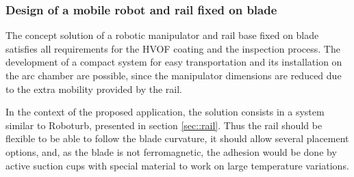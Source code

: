 \subsubsection{Design of a mobile robot and rail fixed on blade}\label{proj_rail}
The concept solution of a robotic manipulator and rail base fixed on blade
satisfies all requirements for the HVOF coating and the inspection process. The
development of a compact system for easy transportation and its installation on the arc
chamber are possible, since the manipulator dimensions are reduced due to the
extra mobility provided by the rail.


In the context of the proposed application, the solution consists in a system
similar to Roboturb, presented in section \ref{sec::rail}. Thus the rail should
be flexible to be able to follow the blade curvature, it should allow several
placement options, and, as the blade is not ferromagnetic, the adhesion would
be done by active suction cups with special material to work on large
temperature variations.



